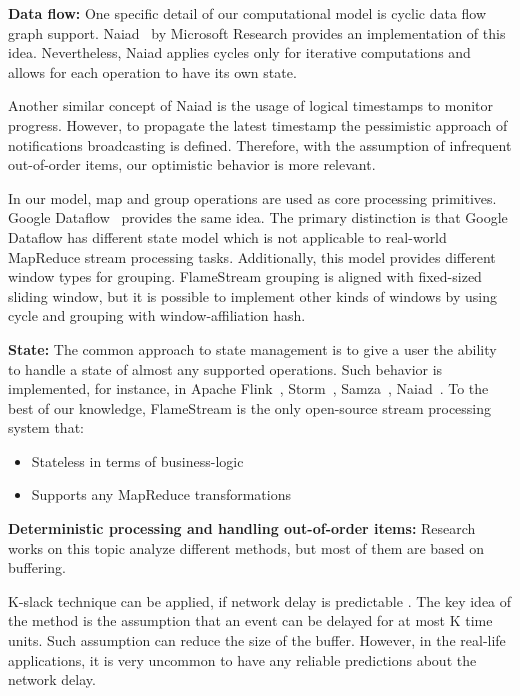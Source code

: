 
\label {fs-related-section}

{\bf Data flow:}
One specific detail of our computational model is cyclic data flow graph support. Naiad~\cite{Murray:2013:NTD:2517349.2522738} by Microsoft Research provides an implementation of this idea. Nevertheless, Naiad applies cycles only for iterative computations and allows for each operation to have its own state. 

Another similar concept of Naiad is the usage of logical timestamps to monitor progress. However, to propagate the latest timestamp the pessimistic approach of notifications broadcasting is defined. Therefore, with the assumption of infrequent out-of-order items, our optimistic behavior is more relevant.

In our model, map and group operations are used as core processing primitives. Google Dataflow~\cite{Akidau:2015:DMP:2824032.2824076} provides the same idea. The primary distinction is that Google Dataflow has different state model which is not applicable to real-world MapReduce stream processing tasks. Additionally, this model provides different window types for grouping. FlameStream grouping is aligned with fixed-sized sliding window, but it is possible to implement other kinds of windows by using cycle and grouping with window-affiliation hash.

{\bf State:}
The common approach to state management is to give a user the ability to handle a state of almost any supported operations. Such behavior is implemented, for instance, in Apache Flink~\cite{carbone2015apache}, Storm~\cite{apache:storm}, Samza~\cite{Noghabi:2017:SSS:3137765.3137770}, Naiad~\cite{Murray:2013:NTD:2517349.2522738}.
To the best of our knowledge, FlameStream is the only open-source stream processing system that:
\begin{itemize}
    \item Stateless in terms of business-logic
    \item Supports any MapReduce transformations 
\end{itemize}

{\bf Deterministic processing and handling out-of-order items:}
Research works on this topic analyze different methods, but most of them are based on buffering.

K-slack technique can be applied, if network delay is predictable \cite{Babu:2004:EKC:1016028.1016032}. The key idea of the method is the assumption that an event can be delayed for at most K time units. Such assumption can reduce the size of the buffer. However, in the real-life applications, it is very uncommon to have any reliable predictions about the network delay.


